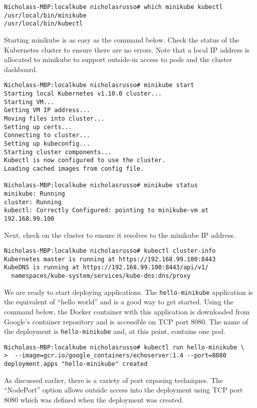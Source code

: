 \begin{verbatim}
Nicholass-MBP:localkube nicholasrusso# which minikube kubectl
/usr/local/bin/minikube
/usr/local/bin/kubectl
\end{verbatim}

Starting minikube is as easy as the command below. Check the status of the
Kubernetes cluster to ensure there are no errors. Note that a local IP address
is allocated to minikube to support outside-in access to pods and the cluster
dashboard.

\begin{verbatim}
Nicholass-MBP:localkube nicholasrusso# minikube start
Starting local Kubernetes v1.10.0 cluster...
Starting VM...
Getting VM IP address...
Moving files into cluster...
Setting up certs...
Connecting to cluster...
Setting up kubeconfig...
Starting cluster components...
Kubectl is now configured to use the cluster.
Loading cached images from config file.

Nicholass-MBP:localkube nicholasrusso# minikube status
minikube: Running
cluster: Running
kubectl: Correctly Configured: pointing to minikube-vm at 192.168.99.100
\end{verbatim}

Next, check on the cluster to ensure it resolves to the minikube IP address.

\begin{verbatim}
Nicholass-MBP:localkube nicholasrusso# kubectl cluster-info
Kubernetes master is running at https://192.168.99.100:8443
KubeDNS is running at https://192.168.99.100:8443/api/v1/
  namespaces/kube-system/services/kube-dns:dns/proxy
\end{verbatim}

We are ready to start deploying applications. The \verb|hello-minikube| application
is the equivalent of ``hello world'' and is a good way to get started. Using the
command below, the Docker container with this application is downloaded from
Google's container repository and is accessible on TCP port 8080. The name of
the deployment is \verb|hello-minikube| and, at this point, contains one pod.

\begin{verbatim}
Nicholass-MBP:localkube nicholasrusso# kubectl run hello-minikube \
>  --image=gcr.io/google_containers/echoserver:1.4 --port=8080
deployment.apps "hello-minikube" created
\end{verbatim}

As discussed earlier, there is a variety of port exposing techniques. The
``NodePort'' option allows outside access into the deployment using TCP port
8080 which was defined when the deployment was created.

